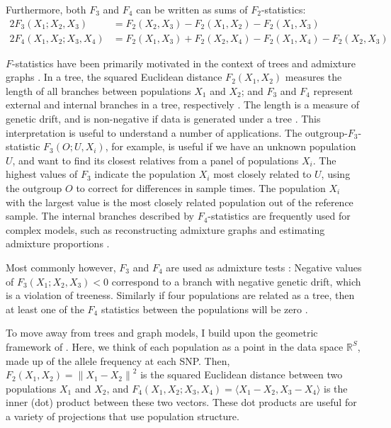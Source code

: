 \documentclass[12pt,fullpage, a4paper]{article}
\newcommand{\normsq}[1]{\left\lVert#1\right\rVert^2}
\begin{document}
 Furthermore, both $F_3$ and $F_4$ can be written as sums of $F_2$-statistics:
\begin{subequations}
	\begin{align}
2F_3(X_1; X_2, X_3) &= F_2(X_2, X_3) - F_2(X_1, X_2) - F_2(X_1, X_3)\label{eq:f3fromf2}\\
2F_4(X_1, X_2; X_3, X_4) &= F_2(X_1, X_3) + F_2(X_2, X_4) - F_2(X_1,X_4) - F_2(X_2, X_3)\label{eq:f4fromf2}
	\end{align}
\end{subequations}

$F$-statistics have been primarily motivated in the context of trees and admixture graphs \citep{patterson2012}. In a tree, the squared Euclidean distance $F_2(X_1, X_2)$ measures the length of all branches between populations $X_1$ and $X_2$; and $F_3$ and $F_4$ represent external and internal branches in a tree, respectively \citep{peter2016}. The length is a measure of genetic drift, and is non-negative if data is generated under a tree \citep{patterson2012}. This interpretation is useful to understand a number of applications. The outgroup-$F_3$-statistic $F_3(O; U, X_i)$, for example, is useful if we have an unknown population $U$, and want to find its closest relatives from a panel of populations $X_i$. The highest values of $F_3$ indicate the population $X_i$ most closely related to $U$, using the outgroup $O$ to correct for differences in sample times. The population $X_i$ with the largest value is the most closely related population out of the reference sample. The internal branches described by  $F_4$-statistics are frequently used for complex models, such as  reconstructing admixture graphs \citep{patterson2012, lipson2013} and estimating admixture proportions \citep{petr2019, harney2021}.

Most commonly however, $F_3$ and $F_4$ are used as admixture tests \citep{patterson2012}: Negative values of  $F_3(X_1; X_2, X_3) < 0$ correspond to a branch with negative genetic drift, which is a violation of treeness. Similarly if four populations are related as a tree, then at least one of the $F_4$ statistics between the populations will be zero \citep{patterson2012}.

To move away from trees and graph models, I build upon the geometric framework of \cite{oteo-garcia2021}. Here, we think of each population as a point in the data space $\mathbb{R}^S$, made up of the allele frequency at each SNP. Then, $F_2(X_1, X_2) = \normsq{X_1 - X_2}$ is the squared Euclidean distance between two populations $X_1$ and $X_2$, and $F_4(X_1, X_2 ; X_3, X_4) = \langle X_1 - X_2, X_3 - X_4 \rangle$ is the inner (dot) product between these two vectors. These dot products are useful for a variety of projections that use population structure.
\end{document}
